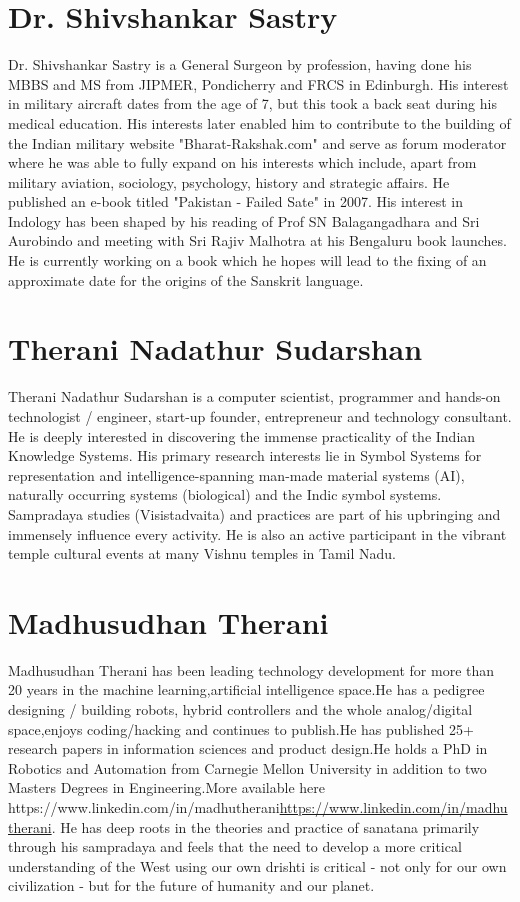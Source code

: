 \section*{Dr. Shivshankar Sastry}

Dr. Shivshankar Sastry is a General Surgeon by profession, having done his MBBS and MS from JIPMER, Pondicherry and FRCS in Edinburgh. His interest in military aircraft dates from the age of 7, but this took a back seat during his medical education. His interests later enabled him to contribute to the building of the Indian military website "Bharat-Rakshak.com" and serve as forum moderator where he was able to fully expand on his interests which include, apart from military aviation, sociology, psychology, history and strategic affairs. He published an e-book titled "Pakistan - Failed Sate" in 2007. His interest in Indology has been shaped by his reading of Prof SN Balagangadhara and Sri Aurobindo and meeting with Sri Rajiv Malhotra at his Bengaluru book launches. He is currently working on a book which he hopes will lead to the fixing of an approximate date for the origins of the Sanskrit language.

\section*{Therani Nadathur Sudarshan}

Therani Nadathur Sudarshan is a computer scientist, programmer and hands-on technologist / engineer, start-up founder, entrepreneur and technology consultant. He is deeply interested in discovering the immense practicality of the Indian Knowledge Systems. His primary research interests lie in Symbol Systems for representation and intelligence-spanning man-made material systems (AI), naturally occurring systems (biological) and the Indic symbol systems. Sampradaya studies (Visistadvaita) and practices are part of his upbringing and immensely influence every activity. He is also an active participant in the vibrant temple cultural events at many Vishnu temples in Tamil Nadu.

\section*{Madhusudhan Therani}

Madhusudhan Therani has been leading technology development for more than 20 years in the machine learning,artificial intelligence space.He has a pedigree designing / building robots, hybrid controllers and the whole analog/digital space,enjoys coding/hacking and continues to publish.He has published 25+ research papers in information sciences and product design.He holds a PhD in Robotics and Automation from Carnegie Mellon University in addition to two Masters Degrees in Engineering.More available here https://www.linkedin.com/in/madhutherani\url{https://www.linkedin.com/in/madhutherani}. He has deep roots in the theories and practice of sanatana primarily through his sampradaya and feels that the need to develop a more critical understanding of the West using our own drishti is critical - not only for our own civilization - but for the future of humanity and our planet.


